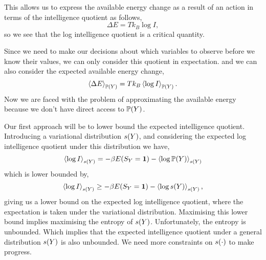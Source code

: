 \documentclass[]{article}
\begin{document}
This allows us to express the available energy change as a result of an action in terms of the intelligence quotient as follows,
\[
\Delta E = T k_B\log I,
\]
so we see that the log intelligence quotient is a critical quantity. 

Since we need to make our decisions about which variables to observe before we know their values, we can only consider this quotient in expectation.
and we can also consider the expected available energy change,
\[
\left\langle \Delta E \right\rangle_{\mathbb{P}(Y)} = T k_B\left\langle \log I \right\rangle_{\mathbb{P}(Y)}.
\]
Now we are faced with the problem of approximating the available energy because we don't have direct access to $\mathbb{P}(Y)$.

Our first approach will be to lower bound the expected intelligence quotient. Introducing a variational distribution $s(Y)$, and considering the expected log intelligence quotient under this distribution we have,
\[
\left\langle \log I \right\rangle_{s(Y)}   = - \beta E(S_Y=\textbf{1}) - \left\langle \log \mathbb{P}(Y) \right\rangle_{s(Y)}
\]
which is lower bounded by,
\begin{equation}
\left\langle \log I \right\rangle_{s(Y)}   \geq - \beta E(S_Y=\textbf{1}) - \left\langle \log s(Y) \right\rangle_{s(Y)}, \label{eqn-lir-lower}
\end{equation}
giving us a lower bound on the expected log intelligence quotient, where the expectation is taken under the variational distribution. Maximising this lower bound implies maximising the entropy of $s(Y)$. Unfortunately, the entropy is unbounded. Which implies that the expected intelligence quotient under a general distribution $s(Y)$ is also unbounded. We need more constraints on $s(\cdot)$ to make progress. 
\end{document}
